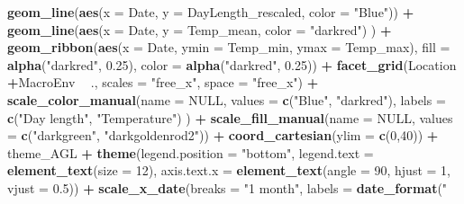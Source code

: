 \documentclass[
]{article}
\newenvironment{Shaded}{\begin{snugshade}}{\end{snugshade}}
\newcommand{\DataTypeTok}[1]{\textcolor[rgb]{0.13,0.29,0.53}{#1}}
\newcommand{\DecValTok}[1]{\textcolor[rgb]{0.00,0.00,0.81}{#1}}
\newcommand{\FloatTok}[1]{\textcolor[rgb]{0.00,0.00,0.81}{#1}}
\newcommand{\KeywordTok}[1]{\textcolor[rgb]{0.13,0.29,0.53}{\textbf{#1}}}
\newcommand{\NormalTok}[1]{#1}
\newcommand{\OperatorTok}[1]{\textcolor[rgb]{0.81,0.36,0.00}{\textbf{#1}}}
\newcommand{\OtherTok}[1]{\textcolor[rgb]{0.56,0.35,0.01}{#1}}
\newcommand{\StringTok}[1]{\textcolor[rgb]{0.31,0.60,0.02}{#1}}
\begin{document}
\begin{Shaded}
\begin{Highlighting}[]
{{{{\StringTok{  }\KeywordTok{geom_line}\NormalTok{(}\KeywordTok{aes}\NormalTok{(}\DataTypeTok{x =}\NormalTok{ Date, }\DataTypeTok{y =}\NormalTok{ DayLength_rescaled, }\DataTypeTok{color =} \StringTok{"Blue"}\NormalTok{)) }\OperatorTok{+}
\StringTok{  }\KeywordTok{geom_line}\NormalTok{(}\KeywordTok{aes}\NormalTok{(}\DataTypeTok{x =}\NormalTok{ Date, }\DataTypeTok{y =}\NormalTok{ Temp_mean, }\DataTypeTok{color =} \StringTok{"darkred"}\NormalTok{) ) }\OperatorTok{+}
\StringTok{  }\KeywordTok{geom_ribbon}\NormalTok{(}\KeywordTok{aes}\NormalTok{(}\DataTypeTok{x =}\NormalTok{ Date, }\DataTypeTok{ymin =}\NormalTok{ Temp_min, }\DataTypeTok{ymax =}\NormalTok{ Temp_max),}
              \DataTypeTok{fill =} \KeywordTok{alpha}\NormalTok{(}\StringTok{"darkred"}\NormalTok{, }\FloatTok{0.25}\NormalTok{), }\DataTypeTok{color =} \KeywordTok{alpha}\NormalTok{(}\StringTok{"darkred"}\NormalTok{, }\FloatTok{0.25}\NormalTok{)) }\OperatorTok{+}
\StringTok{  }\KeywordTok{facet_grid}\NormalTok{(Location }\OperatorTok{+}\NormalTok{MacroEnv  }\OperatorTok{~}\StringTok{ }\NormalTok{., }\DataTypeTok{scales =} \StringTok{"free_x"}\NormalTok{, }\DataTypeTok{space =} \StringTok{"free_x"}\NormalTok{) }\OperatorTok{+}
\StringTok{  }\KeywordTok{scale_color_manual}\NormalTok{(}\DataTypeTok{name =} \OtherTok{NULL}\NormalTok{, }\DataTypeTok{values =} \KeywordTok{c}\NormalTok{(}\StringTok{"Blue"}\NormalTok{, }\StringTok{"darkred"}\NormalTok{), }
                    \DataTypeTok{labels =} \KeywordTok{c}\NormalTok{(}\StringTok{"Day length"}\NormalTok{, }\StringTok{"Temperature"}\NormalTok{) ) }\OperatorTok{+}
\StringTok{  }\KeywordTok{scale_fill_manual}\NormalTok{(}\DataTypeTok{name =} \OtherTok{NULL}\NormalTok{, }\DataTypeTok{values =} \KeywordTok{c}\NormalTok{(}\StringTok{"darkgreen"}\NormalTok{, }\StringTok{"darkgoldenrod2"}\NormalTok{)) }\OperatorTok{+}
\StringTok{  }\KeywordTok{coord_cartesian}\NormalTok{(}\DataTypeTok{ylim =} \KeywordTok{c}\NormalTok{(}\DecValTok{0}\NormalTok{,}\DecValTok{40}\NormalTok{)) }\OperatorTok{+}
\StringTok{  }\NormalTok{theme_AGL }\OperatorTok{+}
\StringTok{  }\KeywordTok{theme}\NormalTok{(}\DataTypeTok{legend.position =} \StringTok{"bottom"}\NormalTok{, }
        \DataTypeTok{legend.text =} \KeywordTok{element_text}\NormalTok{(}\DataTypeTok{size =} \DecValTok{12}\NormalTok{),}
        \DataTypeTok{axis.text.x =} \KeywordTok{element_text}\NormalTok{(}\DataTypeTok{angle =} \DecValTok{90}\NormalTok{, }\DataTypeTok{hjust =} \DecValTok{1}\NormalTok{, }\DataTypeTok{vjust =} \FloatTok{0.5}\NormalTok{)) }\OperatorTok{+}
\StringTok{  }\KeywordTok{scale_x_date}\NormalTok{(}\DataTypeTok{breaks =} \StringTok{"1 month"}\NormalTok{, }\DataTypeTok{labels =} \KeywordTok{date_format}\NormalTok{(}\StringTok{"%
}}}}}
\end{Highlighting}
\end{Shaded}
\end{document}
